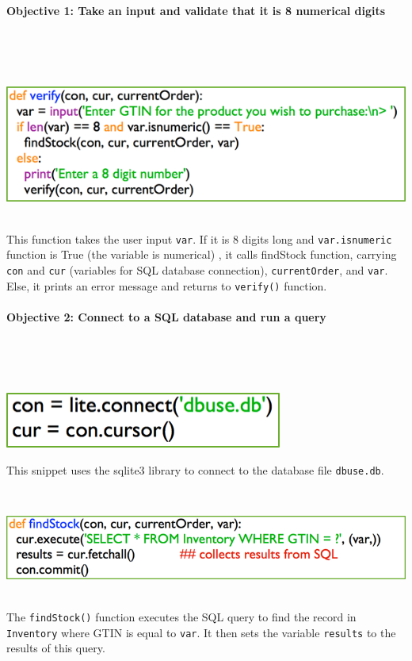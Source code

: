 \documentclass[a4paper]{article}
\begin{document}
\paragraph{Objective 1: Take an input and validate that it is 8 numerical digits} ~\par ~\par
\noindent\includegraphics{task2_obj1_1.png} ~\par
This function takes the user input \verb?var?. If it is 8 digits long and \verb|var.isnumeric| function is True (the variable is numerical) , it calls findStock function, carrying \verb?con? and \verb?cur? (variables for SQL database connection), \verb?currentOrder?, and \verb?var?. Else, it prints an error message and returns to \verb|verify()| function.
\paragraph{Objective 2: Connect to a SQL database and run a query} ~\par ~\par
\noindent\includegraphics{task2_obj2_1.png} ~\par
This snippet uses the sqlite3 library to connect to the database file \verb?dbuse.db?. ~\par ~\par
\noindent\includegraphics{task2_obj2_2.png} ~\par
The \verb|findStock()| function executes the SQL query to find the record in \verb?Inventory? where GTIN is equal to \verb?var?. It then sets the variable \verb?results? to the results of this query. ~\par
\end{document}
